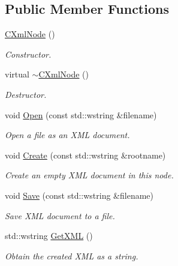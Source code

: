 \subsection*{Public Member Functions}
\begin{DoxyCompactItemize}
\item 
\mbox{\hyperlink{classxmlnode_1_1_c_xml_node_a0f05b63e034bb5620609a2020c591d55}{C\+Xml\+Node}} ()
\begin{DoxyCompactList}\small\item\em Constructor. \end{DoxyCompactList}\item 
\mbox{\label{classxmlnode_1_1_c_xml_node_ad3e072fa0d46c534c08f013405e051ae}} 
virtual \mbox{\hyperlink{classxmlnode_1_1_c_xml_node_ad3e072fa0d46c534c08f013405e051ae}{$\sim$\+C\+Xml\+Node}} ()
\begin{DoxyCompactList}\small\item\em Destructor. \end{DoxyCompactList}\item 
void \mbox{\hyperlink{classxmlnode_1_1_c_xml_node_abfd7b791490e58aac7091b78e36bd24b}{Open}} (const std\+::wstring \&filename)
\begin{DoxyCompactList}\small\item\em Open a file as an X\+ML document. \end{DoxyCompactList}\item 
void \mbox{\hyperlink{classxmlnode_1_1_c_xml_node_a7f4a7dee5a7de490507b9d0ed78dbab7}{Create}} (const std\+::wstring \&rootname)
\begin{DoxyCompactList}\small\item\em Create an empty X\+ML document in this node. \end{DoxyCompactList}\item 
void \mbox{\hyperlink{classxmlnode_1_1_c_xml_node_a0f83eef381fe59726503e0fcb854661d}{Save}} (const std\+::wstring \&filename)
\begin{DoxyCompactList}\small\item\em Save X\+ML document to a file. \end{DoxyCompactList}\item 
std\+::wstring \mbox{\hyperlink{classxmlnode_1_1_c_xml_node_a700c3de386529eab05b185c38b17fd51}{Get\+X\+ML}} ()
\begin{DoxyCompactList}\small\item\em Obtain the created X\+ML as a string. \end{DoxyCompactList}\item 

\end{DoxyCompactItemize}
